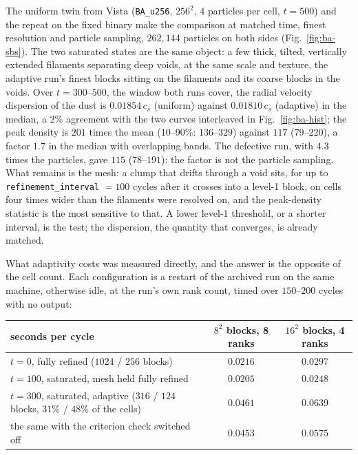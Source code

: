 \documentclass[11pt]{article}
\newcommand{\code}[1]{\texttt{#1}}
\begin{document}
The uniform twin from Vista (\code{BA\_u256}, $256^2$, $4$ particles per cell, $t = 500$)
and the repeat on the fixed binary make the comparison at matched time, finest
resolution and particle sampling, $262{,}144$ particles on both sides
(Fig.~\ref{fig:ba-sbs}). The two saturated states are the same object: a few thick,
tilted, vertically extended filaments separating deep voids, at the same scale and
texture, the adaptive run's finest blocks sitting on the filaments and its coarse blocks
in the voids. Over $t = 300$--$500$, the window both runs cover, the radial velocity
dispersion of the dust is $0.01854\,c_s$ (uniform) against $0.01810\,c_s$ (adaptive) in
the median, a $2\%$ agreement with the two curves interleaved in Fig.~\ref{fig:ba-hist};
the peak density is $201$ times the mean (10--90\%: $136$--$329$) against $117$
($79$--$220$), a factor $1.7$ in the median with overlapping bands. The defective run,
with $4.3$ times the particles, gave $115$ ($78$--$191$): the factor is not the particle
sampling. What remains is the mesh: a clump that drifts through a void sits, for up to
\code{refinement\_interval} $= 100$ cycles after it crosses into a level-1 block, on cells
four times wider than the filaments were resolved on, and the peak-density statistic is
the most sensitive to that. A lower level-1 threshold, or a shorter interval, is the
test; the dispersion, the quantity that converges, is already matched.

What adaptivity costs was measured directly, and the answer is the opposite of the cell
count. Each configuration is a restart of the archived run on the same machine, otherwise
idle, at the run's own rank count, timed over $150$--$200$ cycles with no output:

\begin{center}
\small
\begin{tabular}{@{}lcc@{}}
\toprule
seconds per cycle & $8^2$ blocks, 8 ranks & $16^2$ blocks, 4 ranks \\
\midrule
$t = 0$, fully refined ($1024$ / $256$ blocks) & $0.0216$ & $0.0297$ \\
$t = 100$, saturated, mesh held fully refined & $0.0205$ & $0.0248$ \\
$t = 300$, saturated, adaptive ($316$ / $124$ blocks, $31\%$ / $48\%$ of the cells) & $0.0461$ & $0.0639$ \\
\quad the same with the criterion check switched off & $0.0453$ & $0.0575$ \\
\bottomrule
\end{tabular}
\end{center}
\end{document}
